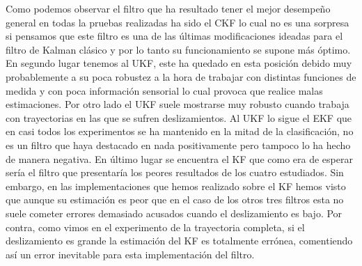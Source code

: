 Como podemos observar el filtro que ha resultado tener el mejor desempeño general en todas la pruebas realizadas ha sido el \ac{CKF} lo cual no es una sorpresa si pensamos que este filtro es una de las últimas modificaciones ideadas para el filtro de Kalman clásico y por lo tanto su funcionamiento se supone más óptimo.
En segundo lugar tenemos al \ac{UKF}, este ha quedado en esta posición debido muy probablemente a su poca robustez a la hora de trabajar con distintas funciones de medida y con poca información sensorial lo cual provoca que realice malas estimaciones.
Por otro lado el \ac{UKF} suele mostrarse muy robusto cuando trabaja con trayectorias en las que se sufren deslizamientos.
Al \ac{UKF} lo sigue  el \ac{EKF} que en casi todos los experimentos se ha mantenido en la mitad de la clasificación, no es un filtro que haya destacado en nada positivamente pero tampoco lo ha hecho de manera negativa.
En último lugar se encuentra el \ac{KF} que como era de esperar sería el filtro que presentaría los peores resultados de los cuatro estudiados.
Sin embargo, en las implementaciones que hemos realizado sobre el \ac{KF} hemos visto que aunque su estimación es peor que en el caso de los otros tres filtros esta no suele cometer errores demasiado acusados cuando el deslizamiento es bajo.
Por contra, como vimos en el experimento de la trayectoria completa, si el deslizamiento es grande la estimación del \ac{KF} es totalmente errónea, comentiendo así un error inevitable para esta implementación del filtro.
